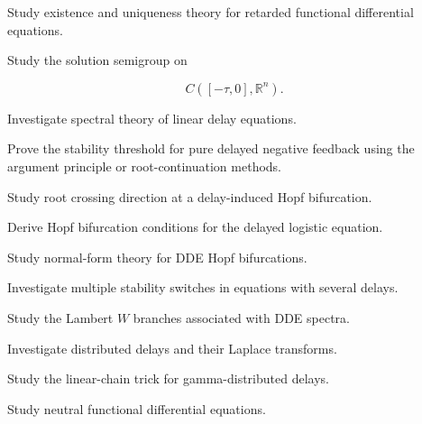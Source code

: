 \begin{exercise}[4]
Study existence and uniqueness theory for retarded functional
differential equations.
\end{exercise}

\begin{exercise}[4]
Study the solution semigroup on

\[
C([-\tau,0],\mathbb{R}^n).
\]
\end{exercise}

\begin{exercise}[4]
Investigate spectral theory of linear delay equations.
\end{exercise}

\begin{exercise}[4]
Prove the stability threshold for pure delayed negative feedback using
the argument principle or root-continuation methods.
\end{exercise}

\begin{exercise}[4]
Study root crossing direction at a delay-induced Hopf bifurcation.
\end{exercise}

\begin{exercise}[4]
Derive Hopf bifurcation conditions for the delayed logistic equation.
\end{exercise}

\begin{exercise}[4]
Study normal-form theory for DDE Hopf bifurcations.
\end{exercise}

\begin{exercise}[4]
Investigate multiple stability switches in equations with several delays.
\end{exercise}

\begin{exercise}[4]
Study the Lambert \(W\) branches associated with DDE spectra.
\end{exercise}

\begin{exercise}[4]
Investigate distributed delays and their Laplace transforms.
\end{exercise}

\begin{exercise}[4]
Study the linear-chain trick for gamma-distributed delays.
\end{exercise}

\begin{exercise}[4]
Study neutral functional differential equations.
\end{exercise}

